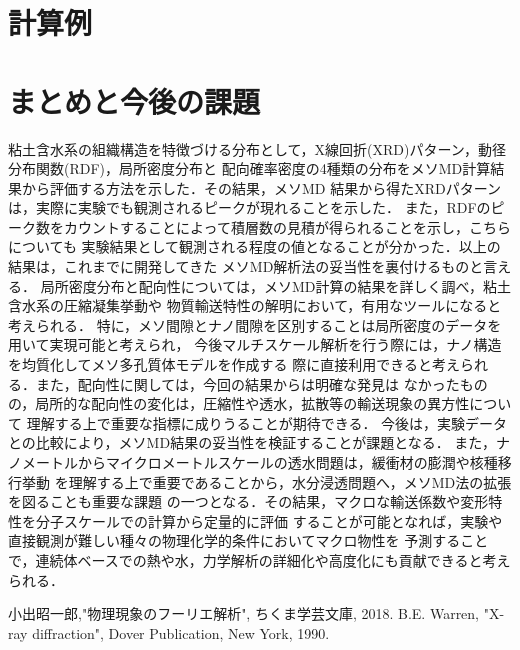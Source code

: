 ﻿\documentclass[11pt,a4j]{jarticle}
\begin{document}
\section{計算例}

\section{まとめと今後の課題}
粘土含水系の組織構造を特徴づける分布として，X線回折(XRD)パターン，動径分布関数(RDF)，局所密度分布と
配向確率密度の4種類の分布をメソMD計算結果から評価する方法を示した．その結果，メソMD
結果から得たXRDパターンは，実際に実験でも観測されるピークが現れることを示した．
また，RDFのピーク数をカウントすることによって積層数の見積が得られることを示し，こちらについても
実験結果として観測される程度の値となることが分かった．以上の結果は，これまでに開発してきた
メソMD解析法の妥当性を裏付けるものと言える．
局所密度分布と配向性については，メソMD計算の結果を詳しく調べ，粘土含水系の圧縮凝集挙動や
物質輸送特性の解明において，有用なツールになると考えられる．
特に，メソ間隙とナノ間隙を区別することは局所密度のデータを用いて実現可能と考えられ，
今後マルチスケール解析を行う際には，ナノ構造を均質化してメソ多孔質体モデルを作成する
際に直接利用できると考えられる．また，配向性に関しては，今回の結果からは明確な発見は
なかったものの，局所的な配向性の変化は，圧縮性や透水，拡散等の輸送現象の異方性について
理解する上で重要な指標に成りうることが期待できる．
今後は，実験データとの比較により，メソMD結果の妥当性を検証することが課題となる．
また，ナノメートルからマイクロメートルスケールの透水問題は，緩衝材の膨潤や核種移行挙動
を理解する上で重要であることから，水分浸透問題へ，メソMD法の拡張を図ることも重要な課題
の一つとなる．その結果，マクロな輸送係数や変形特性を分子スケールでの計算から定量的に評価
することが可能となれば，実験や直接観測が難しい種々の物理化学的条件においてマクロ物性を
予測することで，連続体ベースでの熱や水，力学解析の詳細化や高度化にも貢献できると考えられる．
\begin{thebibliography}{99}
	小出昭一郎,"物理現象のフーリエ解析", ちくま学芸文庫, 2018.
	B.E. Warren, "X-ray diffraction", Dover Publication, New York, 1990.
\end{thebibliography}
\end{document}
